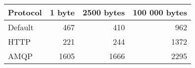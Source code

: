 \begin{tabular}{lrrr}
\hline
 Protocol   &   1 byte &   2500 bytes &   100 000 bytes \\
\hline
 Default    &      467 &          410 &             962 \\
 HTTP       &      221 &          244 &            1372 \\
 AMQP       &     1605 &         1666 &            2295 \\
\hline
\end{tabular}